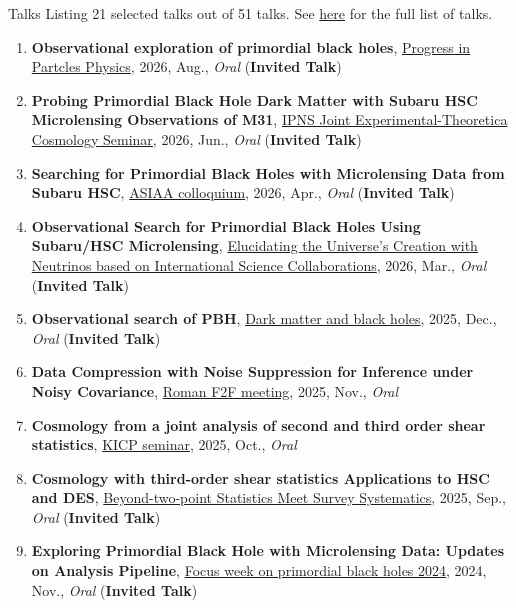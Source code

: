 \begin{rSection}{Talks}
Listing 21 selected talks out of 51 talks.
See \href{https://github.com/git-sunao/cv/blob/main/en/sunao_type_list.pdf}{here} for the full list of talks.\begin{enumerate}[itemsep=0pt, parsep=0pt, topsep=0pt, partopsep=0pt]
\item \textbf{Observational exploration of primordial black holes}, \href{https://indico.yukawa.kyoto-u.ac.jp/event/95/overview}{Progress in Partcles Physics}, 2026, Aug., \textit{Oral} (\textbf{Invited Talk})
\item \textbf{Probing Primordial Black Hole Dark Matter with Subaru HSC Microlensing Observations of M31}, \href{https://cosmophysics.gitlab.io/jointseminar.gitlab.io/sugiyama20260615.html}{IPNS Joint Experimental-Theoretica Cosmology Seminar}, 2026, Jun., \textit{Oral} (\textbf{Invited Talk})
\item \textbf{Searching for Primordial Black Holes with Microlensing Data from Subaru HSC}, \href{https://www.asiaa.sinica.edu.tw/activity/colloquium.php}{ASIAA colloquium}, 2026, Apr., \textit{Oral} (\textbf{Invited Talk})
\item \textbf{Observational Search for Primordial Black Holes Using Subaru/HSC Microlensing}, \href{https://www-kam2.icrr.u-tokyo.ac.jp/event/19/}{Elucidating the Universe's Creation with Neutrinos based on International Science Collaborations}, 2026, Mar., \textit{Oral} (\textbf{Invited Talk})
\item \textbf{Observational search of PBH}, \href{https://indico.ipmu.jp/event/464/timetable/#20251205}{Dark matter and black holes}, 2025, Dec., \textit{Oral} (\textbf{Invited Talk})
\item \textbf{Data Compression with Noise Suppression 
for Inference under Noisy Covariance}, \href{https://roman-hlis-cosmology.caltech.edu/news/2024-f2f}{Roman F2F meeting}, 2025, Nov., \textit{Oral}
\item \textbf{Cosmology from a joint analysis of second and third order shear statistics}, \href{https://astrophysics.uchicago.edu/events/event/2530/?past=y}{KICP seminar}, 2025, Oct., \textit{Oral}
\item \textbf{Cosmology with third-order shear statistics Applications to HSC and DES}, \href{https://indico.ipmu.jp/event/460/overview}{Beyond-two-point Statistics Meet Survey Systematics}, 2025, Sep., \textit{Oral} (\textbf{Invited Talk})
\item \textbf{Exploring Primordial Black Hole with Microlensing Data: Updates on Analysis Pipeline}, \href{https://indico.ipmu.jp/event/439/overview}{Focus week on primordial black holes 2024}, 2024, Nov., \textit{Oral} (\textbf{Invited Talk})

\end{enumerate}
\end{rSection}
